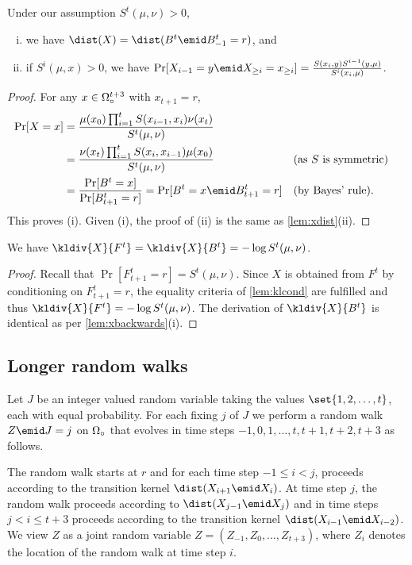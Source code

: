 \begin{lemma}
\label{lem:xbackwards}
Under our assumption $S^t(\mu,\nu)>0$,
\begin{enumerate}[(i)]
  \item we have $\dist(X) = \dist(B^t\emid B^t_{-1}=r)$, and
  \item if $S^i(\mu, x)>0$, we have 
      $\Pr[X_{i-1}=y\emid X_{\ge i} = x_{\ge i}] = 
          \frac{S(x_i,y)S^{i-1}(y,\mu)}{S^i(x_i,\mu)}$.
\end{enumerate}
\end{lemma}
\begin{proof}
For any $x\in\Omega_\circ^{t+3}$ with $x_{t+1} = r$,
  \begin{align*}
    \Pr[X = x] &= \frac{\mu(x_0)\prod_{i=1}^t S(x_{i-1},x_i)\nu(x_t)}
    {S^t(\mu,\nu)}\\
    &=\frac{\nu(x_t)\prod_{i=1}^t S(x_i, x_{i-1}) \mu(x_0)}
        {S^t(\mu,\nu)}
            &&\text{(as $S$ is symmetric)}\\
    &= \frac{\Pr[B^t = x]}{\Pr[B^t_{t+1} = r]}
     = \Pr[B^t = x \emid B^t_{t+1} = r]
        &&\text{(by Bayes' rule).}
  \end{align*}
This proves (i). Given (i), the proof of (ii) is 
the same as \autoref{lem:xdist}(ii).
\end{proof}


\begin{lemma}
\label{lem:xvsf}
We have $\kldiv{X}{F^t} = \kldiv{X}{B^t} = -\log S^t(\mu,\nu)$.
\end{lemma}
\begin{proof}
Recall that $\Pr[F^t_{t+1}=r] = S^t(\mu,\nu)$. 
Since $X$ is obtained from $F^t$ by
conditioning on $F^t_{t+1}=r$, the equality
criteria of \autoref{lem:klcond} are
fulfilled and thus $\kldiv{X}{F^t}=-\log S^t(\mu,\nu)$.
The derivation of $\kldiv{X}{B^t}$ is
identical as per \autoref{lem:xbackwards}(i).
\end{proof}

\subsection{Longer random walks}
\label{sec:zdef}
Let $J$ be an integer valued random variable taking
the values $\set{1,2,\ldots,t}$, each with equal probability. For each fixing
$j$ of $J$ we perform a random walk $Z\emid J=j$ on 
$\Omega_\circ$ that evolves
in time steps $-1,0,1,\ldots,t,t+1,t+2,t+3$ as follows.

The random walk starts at $r$ and for each time step 
$-1\le i <j$, proceeds according to the
transition kernel $\dist(X_{i+1}\emid X_{i})$. At time step
$j$, the random walk proceeds according to 
$\dist(X_{j-1}\emid X_{j})$ and in time steps 
$j< i \le t+3$ proceeds according to the transition kernel 
$\dist(X_{i-1}\emid X_{i-2})$. We view $Z$ as a joint random
variable $Z=(Z_{-1},Z_0,\ldots,Z_{t+3})$, where $Z_i$ denotes
the location of the random walk at time step $i$.

